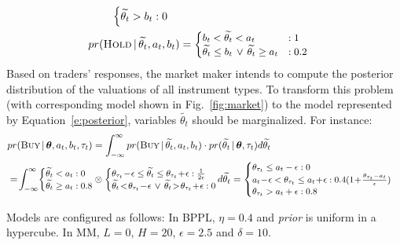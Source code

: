 {\begin{align*}
{\begin{cases}
\widetilde{\theta_{t}} > b_{t} 		: 0
\end{cases}
}
\\
pr (\textsc{Hold} \, | \, \widetilde{\theta_{t}}, a_{t}, b_{t}) &=
{\footnotesize
\begin{cases}
b_{t} < \widetilde{\theta_{t}} < a_{t} 								 & : 1\\
\widetilde{\theta_{t}} \leq b_{t} \, \vee\,  \widetilde{\theta_{t}} \geq a_{t}	 	 & : 0.2
\end{cases}
}
\end{align*}
Based on traders' responses, the market maker intends to compute the posterior distribution of the valuations of all instrument types.
To transform this problem (with corresponding model shown in Fig.~\ref{fig:market})
to the model represented by Equation~\ref{e:posterior}, variables $\widetilde{\theta_{t}}$ should be marginalized.
For instance:
\begin{align*}
&pr(\textsc{Buy} \, | \, \boldsymbol\theta, a_{t}, b_{t}, \tau_t) = 
\int_{-\infty}^{\infty} pr(\textsc{Buy} \, | \, \widetilde{\theta_t}, a_{t}, b_{t})
\cdot pr (\widetilde{\theta_t} \, | \, \boldsymbol\theta, \tau_t ) d \widetilde{\theta_t} \\
&= \! \int_{-\infty}^{\infty}
{\footnotesize
\!
\begin{cases}
\widetilde{\theta_t}  		<     a_{t}  : 0\\
\widetilde{\theta_t}  		\geq a_{t}  : 0.8
\end{cases} 
}
\!\!\!\!\!\!
\otimes
{\footnotesize
\begin{cases}
\theta_{\tau_t} \!-\! \epsilon \leq \widetilde{\theta_t} \leq \theta_{\tau_t} \!+\! \epsilon 					: \frac{1}{2 \epsilon} \\
\widetilde{\theta_t} \!<\! \theta_{\tau_t} \!-\! \epsilon \, \vee \, \widetilde{\theta_t} \!>\! \theta_{\tau_t} \!+\! \epsilon 	: 0  
\end{cases}
}
\!\!\!\!\!
d \widetilde{\theta_t}
=
{\footnotesize
\begin{cases}
\theta_{\tau_t} \leq a_{t} - \epsilon: 0\\
a_{t} \!-\! \epsilon < \theta_{\tau_t} \leq a_{t} \!+\! \epsilon: 
0.4(1 \!+\! \frac{\theta_{\tau_t} - a_t}{\epsilon})\\
\theta_{\tau_t} > a_{t} + \epsilon : 0.8
\end{cases}
}
\end{align*}
}%

Models are configured as follows: In BPPL, $\eta = 0.4$ and \emph{prior} is uniform in a hypercube.
In MM, $L = 0$, $H=20$, $\epsilon = 2.5$ and $\delta=10$. 

